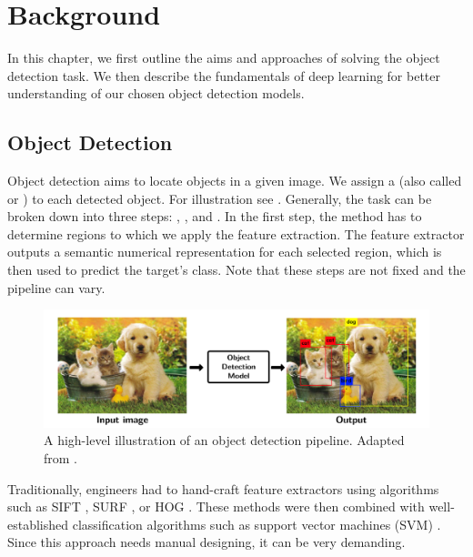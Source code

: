 \chapter{Background}
In this chapter, we first outline the aims and approaches of solving the object
detection task. We then describe the fundamentals of deep learning for better
understanding of our chosen object detection models.

\section{Object Detection}
Object detection aims to locate objects in a given image. We assign a
 (also called  or ) to each detected object.
For illustration see . Generally, the task can be broken
down into three steps: ,
, and . In the first step, the
method has to determine regions to which we apply the feature extraction. The
feature extractor outputs a semantic numerical representation for each selected
region, which is then used to predict the target's class. Note that these steps are
not fixed and the pipeline can vary.

\begin{figure}[h]
    \centering
    \includegraphics[width=0.9\linewidth]{Sources/Figures/objectdetection.png}
    \caption{A high-level illustration of an object detection pipeline. Adapted
        from \cite{objectdetectionfigure}.}
    \label{fig:od}
\end{figure}

Traditionally, engineers had to hand-craft feature extractors using algorithms
such as SIFT \cite{sift}, SURF \cite{surf}, or HOG \cite{hog}. These methods were
then combined with well-established classification algorithms such as support
vector machines (SVM) \cite{svm}. Since this approach needs manual designing, it
can be very demanding.

